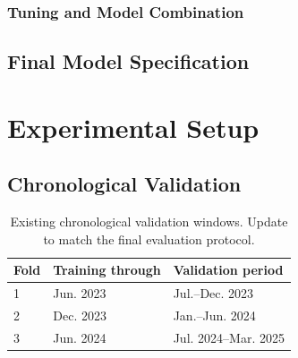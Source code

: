 \documentclass[conference]{IEEEtran}
\newif\ifoutline
\newcommand{\guide}[1]{%
  \ifoutline\par\noindent{\small\color{blue!65!black}%
  \textit{Writing prompt: #1}}\par\fi}
\begin{document}
\subsubsection{Tuning and Model Combination}
\guide{Describe completed tuning, early stopping or ensemble experiments.
If an ensemble was used, specify its component models, training protocol and
how its weights were selected without using evaluation labels. Remove this
heading when the final method is a single model with no relevant experiment.}

\subsection{Final Model Specification}
\label{sec:finalmodel}
\guide{Give the selected final model or ensemble, exact feature groups,
target transformation, hyperparameters and training procedure. Explain the
selection criterion. This subsection must describe the implemented final
system, not merely the highest-scoring intermediate run. State the final
refitting procedure and any post-processing used for test predictions.}

\section{Experimental Setup}
\label{sec:experiments}

\subsection{Chronological Validation}
\guide{Explain why evaluation must train on earlier rentals and predict later
rentals. Table~\ref{tab:folds} shows the existing expanding windows. Replace
or supplement them if the final protocol changes. State the prediction
horizon and any gap. Explain how final performance was evaluated separately
from tuning, or explicitly disclose reuse of the tuning folds.}

\begin{table}[t]
  \caption{Existing chronological validation windows. Update to match the
  final evaluation protocol.}
  \label{tab:folds}
  \centering
  \small
  \begin{tabularx}{\columnwidth}{lXX}
    \toprule
    Fold & Training through & Validation period \\
    \midrule
    1 & Jun. 2023 & Jul.--Dec. 2023 \\
    2 & Dec. 2023 & Jan.--Jun. 2024 \\
    3 & Jun. 2024 & Jul. 2024--Mar. 2025 \\
    \bottomrule
  \end{tabularx}
\end{table}
\guide{The current validation blocks span 6, 6 and 9 months, while the
maximum test prediction distance is 16 months after the last training month.
Describe any completed longer-horizon evaluation, or acknowledge the horizon
limitation. A fold already used to choose models is not an untouched holdout.}
\end{document}
